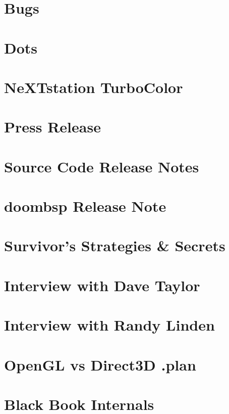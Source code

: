 \documentclass{book}
\begin{document}
    \appendix
    \appendixpage
      \chapter{Bugs}
      
    \chapter{Dots}  
      


    \chapter{NeXTstation TurboColor}
    
    
      \chapter{Press Release}
      
      \chapter{Source Code Release Notes}
      
      \chapter{doombsp Release Note}
      
      \chapter{Survivor's Strategies \& Secrets}
      
   
      \chapter{Interview with Dave Taylor}
      
      \chapter{Interview with Randy Linden}
            
      \chapter{OpenGL vs Direct3D .plan}
      
        \chapter{Black Book Internals}
    
    \cleartoleftpage %
    \blankpage
    \blankpage
    \blankpage
\end{document}
